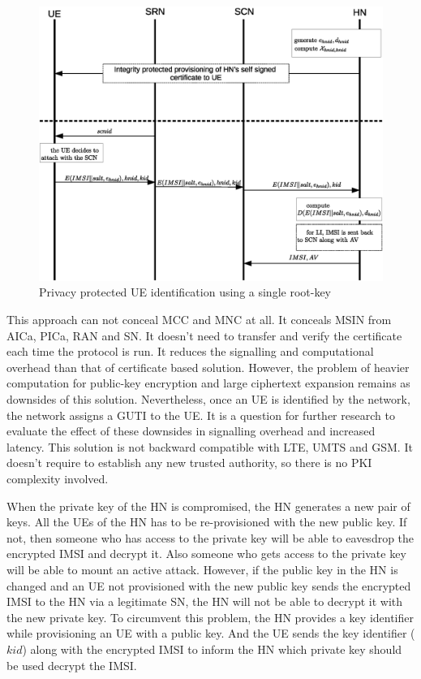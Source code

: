 \documentclass[lnicst,sechang,a4paper]{svmultln}
\begin{document}
\begin{figure}
\begin{center}
  \includegraphics[width=.98\textwidth]{root-key1.eps}
\caption{Privacy protected UE identification using a single root-key}
\label{fig:solution_root-key1}       %
\end{center}
\end{figure}



This approach can not conceal MCC and MNC at all. It conceals MSIN from AICa, PICa, RAN and SN. It doesn't need to transfer and verify the certificate each time the protocol is run. It reduces the signalling and computational overhead than that of certificate based solution. However, the problem of heavier computation for public-key encryption and large ciphertext expansion remains as downsides of this solution.  Nevertheless, once an UE is identified by the network, the network assigns a GUTI to the UE. It is a question for further research to evaluate the effect of these downsides in signalling overhead and increased latency. This solution is not backward compatible with LTE, UMTS and GSM. It doesn't require to establish any new trusted authority, so there is no PKI complexity involved.

When the private key of the HN is compromised, the HN generates a new pair of keys. All the UEs of the HN has to be re-provisioned with the new public key. If not, then someone who has access to the private key will be able to eavesdrop the encrypted IMSI and decrypt it. Also someone who gets access to the private key will be able to mount an active attack. However, if the public key in the HN is changed and an UE not provisioned with the new public key sends the encrypted IMSI to the HN via a legitimate SN, the HN will not be able to decrypt it with the new private key. To circumvent this problem, the HN provides a key identifier while provisioning an UE with a public key. And the UE sends the key identifier ($kid$) along with the encrypted IMSI to inform the HN which private key should be used decrypt the IMSI. 
\end{document}
